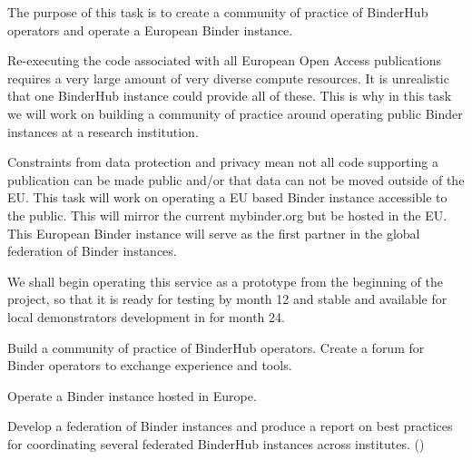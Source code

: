 \begin{task}[
  title=Prototype European Binder instance and global federation,
  id=eu-binder,
  lead=SRL,
  PM=21,  %
  wphases={0-48!.5},
  partners={EGI,UPSUD,WTT}
]

  The purpose of this task is to create a community of practice of BinderHub
  operators and operate a European Binder instance.

  Re-executing the code associated with all European Open Access publications
  requires a very large amount of very diverse compute resources. It is
  unrealistic that one BinderHub instance could provide all of these. This is
  why in this task we will work on building a community of practice around
  operating public Binder instances at a research institution.

  Constraints from data protection and privacy mean not all code supporting a
  publication can be made public and/or that data can not be moved outside of
  the EU. This task will work on operating a EU based Binder instance accessible
  to the public. This will mirror the current mybinder.org but be hosted in
  the EU. This European Binder instance will serve as the first partner in the
  global federation of Binder instances.

  We shall begin operating this service as a prototype
  from the beginning of the project,
  so that it is ready for testing by month 12
  and stable and available for local demonstrators
  development in  for month 24.


  \begin{compactitem}
  \item Build a community of practice of BinderHub operators. Create a forum
  for Binder operators to exchange experience and tools.

  \item Operate a Binder instance hosted in Europe.

  \item Develop a federation of Binder instances and produce a report on best
    practices for coordinating several federated BinderHub instances across
    institutes.
    ()
  \end{compactitem}
\end{task}
